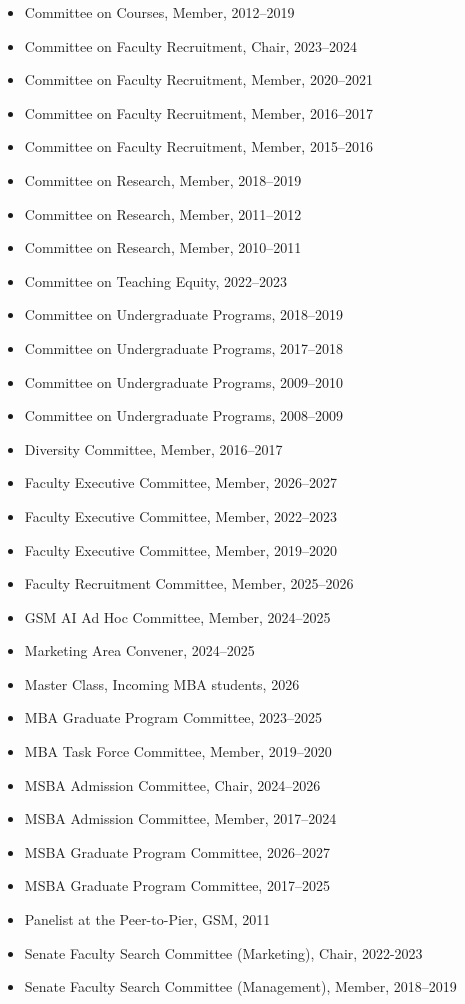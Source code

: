 \documentclass[10pt]{article}
\begin{document}
\begin{itemize}
\item[] Committee on Courses, Member, 2012--2019
\item[] Committee on Faculty Recruitment, Chair, 2023--2024
\item[] Committee on Faculty Recruitment, Member, 2020--2021
\item[] Committee on Faculty Recruitment, Member, 2016--2017
\item[] Committee on Faculty Recruitment, Member, 2015--2016
\item[] Committee on Research, Member, 2018--2019
\item[] Committee on Research, Member, 2011--2012
\item[] Committee on Research, Member, 2010--2011
\item[] Committee on Teaching Equity, 2022--2023
\item[] Committee on Undergraduate Programs, 2018--2019
\item[] Committee on Undergraduate Programs, 2017--2018
\item[] Committee on Undergraduate Programs, 2009--2010
\item[] Committee on Undergraduate Programs, 2008--2009
\item[] Diversity Committee, Member, 2016--2017
\item[] Faculty Executive Committee, Member, 2026--2027
\item[] Faculty Executive Committee, Member, 2022--2023
\item[] Faculty Executive Committee, Member, 2019--2020
\item[] Faculty Recruitment Committee, Member, 2025--2026

\item[] GSM AI Ad Hoc Committee, Member, 2024--2025

\item[] Marketing Area Convener, 2024--2025
\item[] Master Class, Incoming MBA students, 2026

\item[] MBA Graduate Program Committee, 2023--2025

\item[] MBA Task Force Committee, Member, 2019--2020

\item[] MSBA Admission Committee, Chair, 2024--2026
\item[] MSBA Admission Committee, Member, 2017--2024

\item[] MSBA Graduate Program Committee, 2026--2027
\item[] MSBA Graduate Program Committee, 2017--2025
\item[] Panelist at the Peer-to-Pier, GSM, 2011
\item[] Senate Faculty Search Committee (Marketing), Chair, 2022-2023
\item[] Senate Faculty Search Committee (Management), Member, 2018--2019
\end{itemize}
\end{document}

